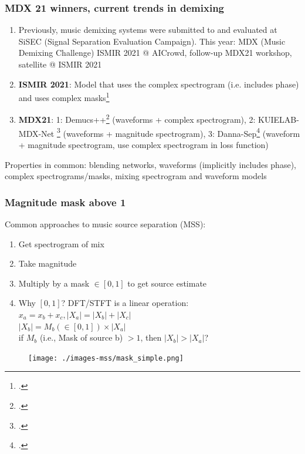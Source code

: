 \documentclass[usenames,dvipsnames]{beamer}
\begin{document}
\begin{frame}
	\frametitle{MDX 21 winners, current trends in demixing}
	\begin{enumerate}
		\item
			Previously, music demixing systems were submitted to and evaluated at SiSEC (Signal Separation Evaluation Campaign). This year: MDX (Music Demixing Challenge) ISMIR 2021 @ AICrowd, follow-up MDX21 workshop, satellite @ ISMIR 2021
		\item
			\textbf{ISMIR 2021}: Model that uses the complex spectrogram (i.e. includes phase) and uses complex masks\footcite{kong2021decoupling}
		\item
			\textbf{MDX21}: 1: Demucs++\footcite{demucsplus} (waveforms + complex spectrogram), 2: KUIELAB-MDX-Net \footcite{choi2021} (waveforms + magnitude spectrogram), 3: Danna-Sep\footcite{dannasep} (waveform + magnitude spectrogram, use complex spectrogram in loss function)
	\end{enumerate}
	Properties in common: blending networks, waveforms (implicitly includes phase), complex spectrograms/masks, mixing spectrogram and waveform models
\end{frame}

\begin{frame}
	\frametitle{Magnitude mask above 1}
	Common approaches to music source separation (MSS):
	\begin{enumerate}
		\item
			Get spectrogram of mix
		\item
			Take magnitude
		\item
			Multiply by a mask $\in [0, 1]$ to get source estimate
		\item
			Why $[0, 1]$? DFT/STFT is a linear operation: $x_{a} = x_{b} + x_{c}, |X_{a}| = |X_{b}| + |X_{c}|$\\
			$|X_{b}| = M_{b}(\in [0, 1]) \times |X_{a}|$\\
			if $M_{b}$ (i.e., Mask of source b) $> 1$, then $|X_{b}| > |X_{a}|$?
	\end{enumerate}
	\begin{figure}
	\centering
	\texttt{[image: ./images-mss/mask\_simple.png]}
	\end{figure}
\end{frame}
\end{document}
